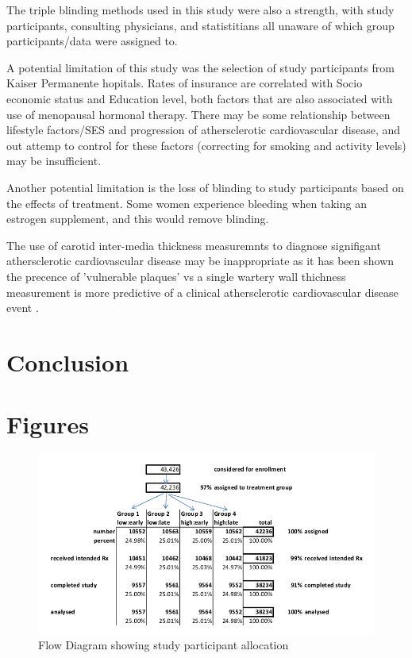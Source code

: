 \documentclass[11pt]{article}
\begin{document}
		The triple blinding methods used in this study were also a strength, with study participants, consulting physicians, and statistitians all unaware of which group participants/data were assigned to.


		A potential limitation of this study was the selection of study participants from Kaiser Permanente hopitals.
		Rates of insurance are correlated with Socio economic status and Education level, both factors that are also associated with use of menopausal hormonal therapy.
		There may be some relationship between lifestyle factors/SES and progression of athersclerotic cardiovascular disease, and out attemp to control for these factors (correcting for smoking and activity levels) may be insufficient.


		Another potential limitation is the loss of blinding to study participants based on the effects of treatment. Some women experience bleeding when taking an estrogen supplement, and this would remove blinding.


		The use of carotid inter-media thickness measuremnts to diagnose signifigant athersclerotic cardiovascular disease may be inappropriate as it has been shown the precence of 'vulnerable plaques' vs a single wartery wall thichness measurement is more predictive of a clinical athersclerotic cardiovascular disease event \cite{Maseri2003}.
		

	\section{Conclusion}
		


	\section{Figures}

\begin{figure}[h!]
	\centering
	\includegraphics[scale=0.5]{figure1.jpg}
	\caption{Flow Diagram showing study participant allocation}
	\label{flow}
\end{figure}
\end{document}
